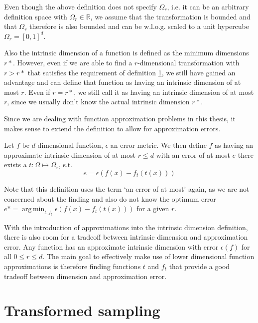 \documentclass[
  a4paper,  %
  twoside,  %
  bibliography=totoc,
  headsepline,
  cleardoublepage=empty,
  parskip=half,
  draft=false
]{scrbook}
\DeclareMathOperator*{\argmin}{arg\,min}
\begin{document}
Even though the above definition does not specify $\Omega_r$, i.e. it can be an arbitrary definition space with $\Omega_r \in \mathds{R}$, we assume that the transformation is bounded and that $\Omega_r$ therefore is also bounded and can be w.l.o.g. scaled to a unit hypercube $\Omega_r=[0,1]^d$.

Also the intrinsic dimension of a function is defined as the minimum dimensions $r*$.
However, even if we are able to find a $r$-dimensional transformation with $r > r*$ that satisfies the requirement of definition \ref{}, we still have gained an advantage and can define that function as having an intrinsic dimension of at most $r$.
Even if $r=r*$, we still call it as having an intrinsic dimension of at most $r$, since we usually don't know the actual intrinsic dimension $r*$.

Since we are dealing with function approximation problems in this thesis, it makes sense to extend the definition to allow for approximation errors.
\begin{definition}
Let $f$ be $d$-dimensional function, $\epsilon$ an error metric.
We then define $f$ as having an approximate intrinsic dimension of at most $r \leq d$ with an error of at most $e$ there exists a $t \colon \Omega \mapsto \Omega_r$, s.t.
\begin{equation}
e=\epsilon(f(x) - f_t(t(x)))
\end{equation}
\end{definition}
Note that this definition uses the term `an error of at most' again, as we are not concerned about the finding and also do not know the optimum error $e*= \argmin_{t, f_t} \epsilon(f(x) - f_t(t(x)))$ for a given $r$.

With the introduction of approximations into the intrinsic dimension definition, there is also room for a tradeoff between  intrinsic dimension and approximation error.
Any function has an approximate intrinsic dimension with error $\epsilon(f)$ for all $0 \leq r \leq d$.
The main goal to effectively make use of lower dimensional function approximations is therefore finding functions $t$ and $f_t$ that provide a good tradeoff between dimension and approximation error.

\section{Transformed sampling}
\end{document}
